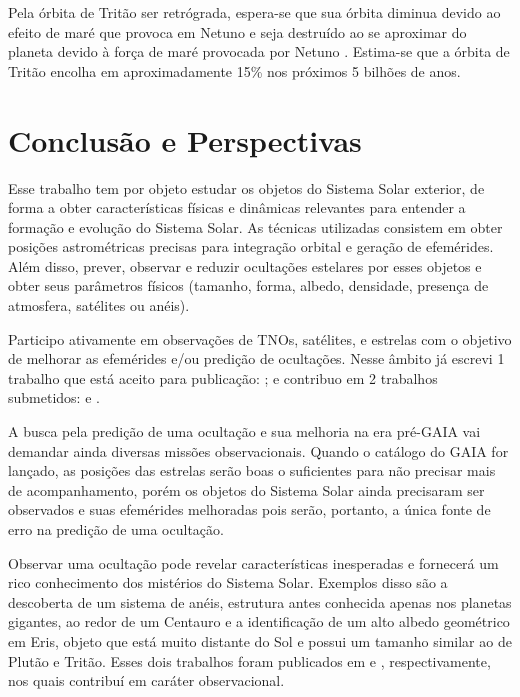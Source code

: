 \documentclass[12pt,a4paper]{monografia}
\begin{document}
Pela órbita de Tritão ser retrógrada, espera-se que sua órbita diminua devido ao efeito de maré que provoca em Netuno e seja destruído ao se aproximar do planeta devido à força de maré provocada por Netuno \citep{McKinnon2007}. Estima-se que a órbita de Tritão encolha em aproximadamente 15\% nos próximos 5 bilhões de anos.


\chapter{Conclusão e Perspectivas}
\label{Cap: perspectivas}

\indent \indent Esse trabalho tem por objeto estudar os objetos do Sistema Solar exterior, de forma a obter características físicas e dinâmicas relevantes para entender a formação e evolução do Sistema Solar. As técnicas utilizadas consistem em obter posições astrométricas precisas para integração orbital e geração de efemérides. Além disso, prever, observar e reduzir ocultações estelares por esses objetos e obter seus parâmetros físicos (tamanho, forma, albedo, densidade, presença de atmosfera, satélites ou anéis).

Participo ativamente em observações de TNOs, satélites, e estrelas com o objetivo de melhorar as efemérides e/ou predição de ocultações. Nesse âmbito já escrevi 1 trabalho que está aceito para publicação: \cite{GomesJunior2015-Irregular}; e contribuo em 2 trabalhos submetidos: \cite{Camargo2015} e \cite{Desmars2015}.

A busca pela predição de uma ocultação e sua melhoria na era pré-GAIA vai demandar ainda diversas missões observacionais. Quando o catálogo do GAIA for lançado, as posições das estrelas serão boas o suficientes para não precisar mais de acompanhamento, porém os objetos do Sistema Solar ainda precisaram ser observados e suas efemérides melhoradas pois serão, portanto, a única fonte de erro na predição de uma ocultação.

Observar uma ocultação pode revelar características inesperadas e fornecerá um rico conhecimento dos mistérios do Sistema Solar. Exemplos disso são a descoberta de um sistema de anéis, estrutura antes conhecida apenas nos planetas gigantes, ao redor de um Centauro e a identificação de um alto albedo geométrico em Eris, objeto que está muito distante do Sol e possui um tamanho similar ao de Plutão e Tritão. Esses dois trabalhos foram publicados em \cite{BragaRibas2014} e \cite{Sicardy2011}, respectivamente, nos quais contribuí em caráter observacional.
\end{document}
